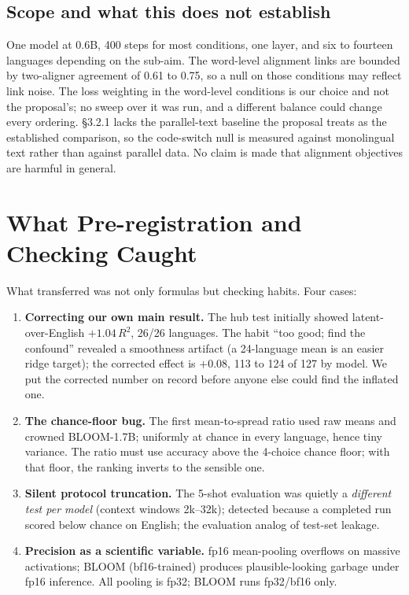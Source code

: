 \documentclass[11pt,a4paper]{article}
\begin{document}
\subsection{Scope and what this does not establish}
One model at 0.6B, 400 steps for most conditions, one layer, and six to fourteen
languages depending on the sub-aim. The word-level alignment links are bounded
by two-aligner agreement of 0.61 to 0.75, so a null on those conditions may reflect
link noise. The loss weighting in the word-level conditions is our choice and not
the proposal's; no sweep over it was run, and a different balance could change
every ordering. \S3.2.1 lacks the parallel-text baseline the proposal treats
as the established comparison, so the code-switch null is measured against
monolingual text rather than against parallel data. No claim is made that
alignment objectives are harmful in general.


\section{What Pre-registration and Checking Caught}
\label{sec:discipline}
What transferred was not only formulas but checking habits. Four cases:
\begin{enumerate}
  \item \textbf{Correcting our own main result.} The hub test initially showed
  latent-over-English $+1.04\,R^2$, 26/26 languages. The habit ``too good; find the confound'' revealed a smoothness artifact (a 24-language mean is an
  easier ridge target); the corrected effect is $+0.08$, 113 to 124 of 127 by model. We put the
  corrected number on record before anyone else could find the inflated one.
  \item \textbf{The chance-floor bug.} The first mean-to-spread ratio used raw
  means and crowned BLOOM-1.7B; uniformly at chance in every language,
  hence tiny variance. The ratio must use accuracy above the 4-choice chance floor; with that floor, the ranking inverts to the sensible one.
  \item \textbf{Silent protocol truncation.} The 5-shot evaluation was
  quietly a \emph{different test per model} (context windows 2k--32k);
  detected because a completed run scored below chance on English; the evaluation analog of test-set leakage.
  \item \textbf{Precision as a scientific variable.} fp16 mean-pooling
  overflows on massive activations; BLOOM (bf16-trained) produces
  plausible-looking garbage under fp16 inference. All pooling is fp32;
  BLOOM runs fp32/bf16 only.
\end{enumerate}
\end{document}
